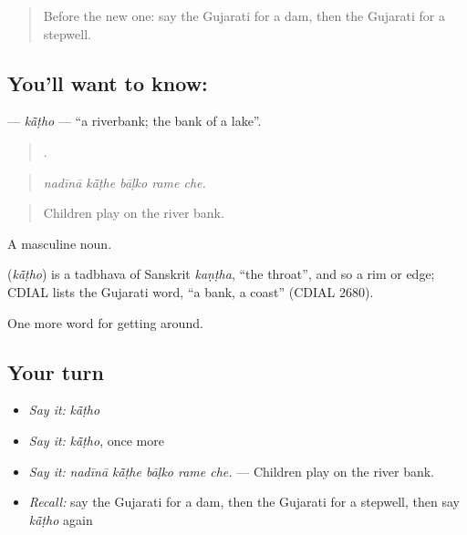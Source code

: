 \label{lesson:GU-C441-katho}



\begin{quote}
Before the new one: say the Gujarati for a dam, then the Gujarati for a stepwell.
\end{quote}

\subsection*{You'll want to know: }
\textbf{} — \emph{kā̃ṭho} — \textquotedblleft{}a riverbank; the bank of a lake\textquotedblright{}.

\begin{quote}
    .
\end{quote}

\begin{quote}
\emph{nadīnā kā̃ṭhe bāḷko rame che.}
\end{quote}

\begin{quote}
Children play on the river bank.
\end{quote}

A masculine noun.

\begin{cousinweb}
\textbf{} (\emph{kā̃ṭho}) is a tadbhava of Sanskrit \emph{kaṇṭha}, \textquotedblleft{}the throat\textquotedblright{}, and so a rim or edge; CDIAL lists the Gujarati word, \textquotedblleft{}a bank, a coast\textquotedblright{} (CDIAL 2680).
\end{cousinweb}

\begin{grammarlens}[title={What you've built}]
One more word for getting around.
\end{grammarlens}

\subsection*{Your turn}
\begin{itemize}
\raggedright
  \item \emph{Say it:} \emph{kā̃ṭho}
  \item \emph{Say it:} \emph{kā̃ṭho}, once more
  \item \emph{Say it:} \emph{nadīnā kā̃ṭhe bāḷko rame che.} — Children play on the river bank.
  \item \emph{Recall:} say the Gujarati for a dam, then the Gujarati for a stepwell, then say \emph{kā̃ṭho} again
\end{itemize}

